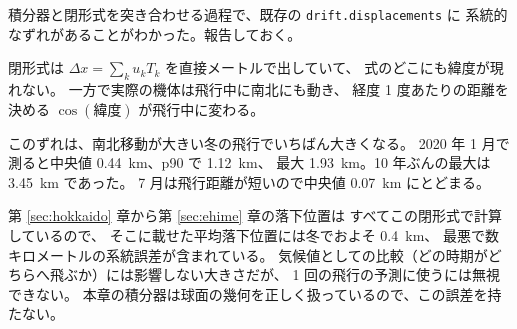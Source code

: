 積分器と閉形式を突き合わせる過程で、既存の \texttt{drift.displacements} に
系統的なずれがあることがわかった。報告しておく。

閉形式は $\Delta x = \sum_k u_k T_k$ を直接メートルで出していて、
式のどこにも緯度が現れない。
一方で実際の機体は飛行中に南北にも動き、
経度 1 度あたりの距離を決める $\cos(\text{緯度})$ が飛行中に変わる。

このずれは、南北移動が大きい冬の飛行でいちばん大きくなる。
2020 年 1 月で測ると中央値 \SI{0.44}{\kilo\metre}、p90 で \SI{1.12}{\kilo\metre}、
最大 \SI{1.93}{\kilo\metre}。10 年ぶんの最大は \SI{3.45}{\kilo\metre} であった。
7 月は飛行距離が短いので中央値 \SI{0.07}{\kilo\metre} にとどまる。

第 \ref{sec:hokkaido} 章から第 \ref{sec:ehime} 章の落下位置は
すべてこの閉形式で計算しているので、
そこに載せた平均落下位置には冬でおよそ \SI{0.4}{\kilo\metre}、
最悪で数キロメートルの系統誤差が含まれている。
気候値としての比較（どの時期がどちらへ飛ぶか）には影響しない大きさだが、
1 回の飛行の予測に使うには無視できない。
本章の積分器は球面の幾何を正しく扱っているので、この誤差を持たない。
